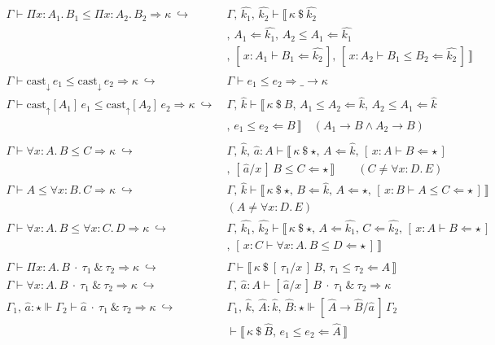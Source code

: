 \documentclass{article}
\newcommand{\inferapp}[4][\kappa]{#2 ~\cdot~#3~\&~#4 \Rightarrow #1}
\newcommand{\acheck}[3]{#1 \le #2 \Leftarrow #3}
\newcommand{\scheck}[2]{#1 \Leftarrow #2}
\newcommand{\lcheck}[5][x]{[\,#1 : #2 \vdash \acheck{#3}{#4}{#5}\,]}
\newcommand{\slcheck}[4][x]{[\,#1 : #2 \vdash \scheck{#3}{#4}\,]}
\newcommand{\ainfer}[3][\kappa]{#2 \le #3 \Rightarrow #1}
\newcommand{\reduce}[2][\kappa]{#2 \longrightarrow #1}
\newcommand{\capp}[2][\kappa]{#1 ~\$~ #2}
\newcommand{\kvar}{\hat{k}}
\newcommand{\kvarn}[2][k]{\hat{#1_{#2}}}
\newcommand{\wlred}{~\hookrightarrow~ &}
\newcommand{\aforall}[3][x]{\forall #1 : #2.\, #3}
\newcommand{\aPi}[3][x]{\Pi #1 : #2.\, #3}
\newcommand{\ngsep}{\\ & ,\,}
\newcommand{\wlgroup}[1]{\llbracket\, #1 \,\rrbracket}
\newcommand{\castdn}[1]{\mathrm{cast}_\downarrow\,#1 }
\newcommand{\castup}[2]{\mathrm{cast}_\uparrow [#1]\,#2 }
\newcommand{\ex}[1][a]{\hat{#1}}
\newcommand{\exb}[2][a]{\hat{#1} : #2}
\newcommand{\subst}[3][x]{[\,#2 / #1\,]\,#3}
\newcommand{\exsubst}[3][a]{\subst[\hat{#1}]{#2}{#3}}
\begin{document}
\begin{align*}
    \Gamma \vdash \ainfer{\aPi{A_1}{B_1}}{\aPi{A_2}{B_2}} \wlred
        \Gamma ,\, \kvarn{1} ,\, \kvarn{2} \vdash \wlgroup{\capp{\kvarn{2}}
        \ngsep \scheck{A_1}{\kvarn{1}} ,\, \acheck{A_2}{A_1}{\kvarn{1}}
        \ngsep \slcheck{A_1}{B_1}{\kvarn{2}} ,\, \lcheck{A_2}{B_1}{B_2}{\kvarn{2}}} \\
    \\
    \Gamma \vdash \ainfer{\castdn{e_1}}{\castdn{e_2}} \wlred \Gamma \vdash \ainfer[\reduce{\_}]{e_1}{e_2} \\
    \Gamma \vdash \ainfer{\castup{A_1}{e_1}}{\castup{A_2}{e_2}} \wlred
        \Gamma ,\, \kvar \vdash \wlgroup{\capp{B} ,\, \acheck{A_1}{A_2}{\kvar} ,\, \acheck{A_2}{A_1}{\kvar}
        \ngsep \acheck{e_1}{e_2}{B}} \quad (\reduce[B]{A_1} \land \reduce[B]{A_2}) \\
    \\
    \Gamma \vdash \ainfer{\aforall{A}{B}}{C} \wlred
        \Gamma ,\, \kvar ,\, \exb[a]{A} \vdash \wlgroup{\capp{\star}
        ,\, \scheck{A}{\kvar} ,\, \slcheck{A}{B}{\star}
        \ngsep \acheck{\subst{\ex[a]}{B}}{C}{\star}} \qquad (C \neq \aforall{D}{E})\\
    \Gamma \vdash \ainfer{A}{\aforall{B}{C}} \wlred
        \Gamma ,\, \kvar \vdash \wlgroup{\capp{\star}
        ,\, \scheck{B}{\kvar} ,\, \scheck{A}{\star}
        ,\, \lcheck{B}{A}{C}{\star}} \\
        & (A \neq \aforall{D}{E}) \\
    \Gamma \vdash \ainfer{\aforall{A}{B}}{\aforall{C}{D}} \wlred
        \Gamma ,\, \kvarn{1} ,\, \kvarn{2} \vdash \wlgroup{\capp{\star}
        ,\, \scheck{A}{\kvarn{1}} ,\, \scheck{C}{\kvarn{2}}
        ,\, \slcheck{A}{B}{\star}
        \ngsep \lcheck{C}{\aforall{A}{B}}{D}{\star}} \\
    \\
    \Gamma \vdash \inferapp{\aPi{A}{B}}{\tau_1}{\tau_2} \wlred
        \Gamma \vdash \wlgroup{\capp{\subst{\tau_1}{B}} ,\, \acheck{\tau_1}{\tau_2}{A}} \\
    \Gamma \vdash \inferapp{\aforall{A}{B}}{\tau_1}{\tau_2} \wlred
        \Gamma ,\, \exb{A} \vdash \inferapp{\subst{\ex}{B}}{\tau_1}{\tau_2} \\
    \Gamma_1 ,\, \exb{\star} \Vdash \Gamma_2 \vdash \inferapp{\ex}{\tau_1}{\tau_2} \wlred
    \Gamma_1 ,\, \kvar ,\, \exb[A]{\kvar} ,\, \exb[B]{\star} \Vdash \exsubst{\ex[A] \rightarrow \ex[B]}{\Gamma_2}
    \\ & \vdash \wlgroup{\capp{\ex[B]} ,\, \acheck{e_1}{e_2}{\ex[A]}} \\

\end{align*}
\end{document}
